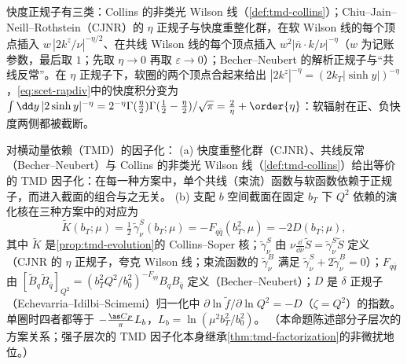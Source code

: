 快度正规子有三类：Collins 的非类光 Wilson 线（\cref{def:tmd-collins}）；Chiu--Jain--Neill--Rothstein（CJNR）的 $\eta$ 正规子与快度重整化群\cite{ChiuEtAl2012a,ChiuEtAl2012b}，在软 Wilson 线的每个顶点插入 $w\,|2k^z/\nu|^{-\eta/2}$、在共线 Wilson 线的每个顶点插入 $w^2|\bar n\cdot k/\nu|^{-\eta}$（$w$ 为记账参数，最后取 $1$；先取 $\eta\to0$ 再取 $\varepsilon\to0$）\cite[式~(4.8)、(4.9)]{ChiuEtAl2012b}；Becher--Neubert 的解析正规子与“共线反常”\cite{BecherNeubert2011}。在 $\eta$ 正规子下，软圈的两个顶点合起来给出 $|2k^z|^{-\eta}=(2k_T|\sinh y|)^{-\eta}$，\cref{eq:scet-rapdiv}中的快度积分变为 $\int\dd y\,|2\sinh y|^{-\eta}=2^{-\eta}\Gamma(\tfrac\eta2)\Gamma(\tfrac12-\tfrac\eta2)/\sqrt\pi=\tfrac2\eta+\order{\eta}$：软辐射在正、负快度两侧都被截断。%

\begin{proposition}\label{prop:scet-rapidity-rg}
对横动量依赖（TMD）的因子化：
(a) 快度重整化群（CJNR）、共线反常（Becher--Neubert）与 Collins 的非类光 Wilson 线（\cref{def:tmd-collins}）给出等价的 TMD 因子化\cite{Collins:2017oxh}：在每一种方案中，单个共线（束流）函数与软函数依赖于正规子，而进入截面的组合与之无关。
(b) 支配 $b$ 空间截面在固定 $b_T$ 下 $Q^2$ 依赖的演化核在三种方案中的对应为
\begin{equation}\label{eq:scet-kernels}
\tilde K(b_T;\mu)=\tfrac12\,\tilde\gamma_\nu^S(b_T;\mu)=-F_{q\bar q}(b_T^2,\mu)=-2D(b_T;\mu),
\end{equation}
其中 $\tilde K$ 是\cref{prop:tmd-evolution}的 Collins--Soper 核；$\tilde\gamma_\nu^S$ 由 $\nu\frac{\dd}{\dd\nu}\tilde S=\tilde\gamma^S_\nu\tilde S$ 定义（CJNR 的 $\eta$ 正规子，夸克 Wilson 线；束流函数的 $\tilde\gamma^B_\nu$ 满足 $\tilde\gamma^S_\nu+2\tilde\gamma^B_\nu=0$\cite[式~(5.38)]{ChiuEtAl2012b}）；$F_{q\bar q}$ 由 $[\tilde B_{q}\tilde B_{\bar q}]_{Q^2}=(b_T^2Q^2/b_0^2)^{-F_{q\bar q}}B_qB_{\bar q}$ 定义（Becher--Neubert\cite[式~(15)]{BecherNeubert2011}）；$D$ 是 $\delta$ 正规子（Echevarria--Idilbi--Scimemi）归一化中 $\partial\ln\tilde f/\partial\ln Q^2=-D$（$\zeta=Q^2$）的指数\cite[式~(5.4)]{EchevarriaIdilbiScimemi2012}。单圈时四者都等于 $-\frac{\as C_F}{\pi}L_b$，$L_b=\ln(\mu^2b_T^2/b_0^2)$。
（本命题陈述部分子层次的方案关系；强子层次的 TMD 因子化本身继承\cref{thm:tmd-factorization}的非微扰地位。）
\end{proposition}

